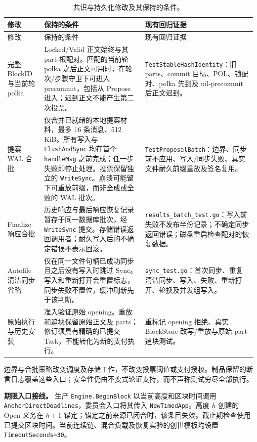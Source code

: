 \begin{longtable}{@{}p{}p{}p{}@{}}
\caption{共识与持久化修改及其保持的条件。}\label{tab:supp-consensus-map}\\
\toprule
修改 & 保持的条件 & 现有回归证据 \\
\midrule\endfirsthead
\toprule 修改 & 保持的条件 & 现有回归证据 \\
\midrule\endhead
完整 BlockID 与当前轮 polka &
Locked/Valid 正文始终与其 part 根配对。匹配的当前轮 polka 之后正文可用时，在轮次/步骤守卫下可进入 precommit，包括从 Propose 进入；迟到正文不能产生第二次投票。 &
\texttt{TestStableHashIdentity}：旧 parts、commit 目标、POL、锁配对、polka 先到及 nil-precommit 后正文迟到。 \\
提案 WAL 合批 &
仅合并已就绪的本地提案材料，最多 16 条消息、512\,KiB。所有写入与 \texttt{FlushAndSync} 均在首个 \texttt{handleMsg} 之前完成；任一步失败即停止处理。投票保留独立的 \texttt{WriteSync}。崩溃可能留下可重放前缀，而非全成或全败的 WAL 批次。 &
\texttt{TestProposalBatch}：边界、同步前不应用、写入/同步失败、真实文件耐久前缀重放及签名复用。 \\
Finalize 响应合批 &
历史响应与最后响应恢复记录暂存于同一数据库批次，经 \texttt{WriteSync} 提交。存储错误返回调用者；耐久写入后的不确定错误不表示回滚。 &
\texttt{results\_batch\_test.go}：写入前失败不发布半份记录；不确定同步返回错误；磁盘重启检查配对的恢复数据。 \\
Autofile 清洁同步省略 &
仅在同一文件句柄已成功同步且之后没有写入时跳过 Sync。写入和重新打开会重置标志，同步失败不置位，缓冲刷新先于该判断。 &
\texttt{sync\_test.go}：首次同步、重复清洁同步、写入、失败、重新打开、轮换及并发组写入。 \\
原始执行与历史安装 &
准入验证原始 opening。重放和追块保留原始正文及 parts；修订须具有精确的已提交 Task，不能转化为新的支付执行。 &
重标记 opening 拒绝、真实 BlockStore 改写/重放与原始 part 追块测试。 \\
\bottomrule
\end{longtable}

边界与合批策略改变调度及存储工作，不改变投票阈值或支付授权。制品保留的断言日志覆盖这些入口；安全性仍由不变式论证支持，而不声称测试穷尽全部执行。

\noindent\textbf{期限入口接线。}
生产 \texttt{Engine.BeginBlock} 以当前高度和区块时间调用 \texttt{AnchorDirectDeadlines}，委员会入口将其传入 \texttt{NewTimedApp}。高度 $h$ 创建的 Open 义务在 $h+1$ 锚定；锚定之前来源已闭合时，该条目失效。截止期检查使用已提交区块时间。当前连续链、混合负载及恢复实验的创世模板均设置 \texttt{TimeoutSeconds=30}。


